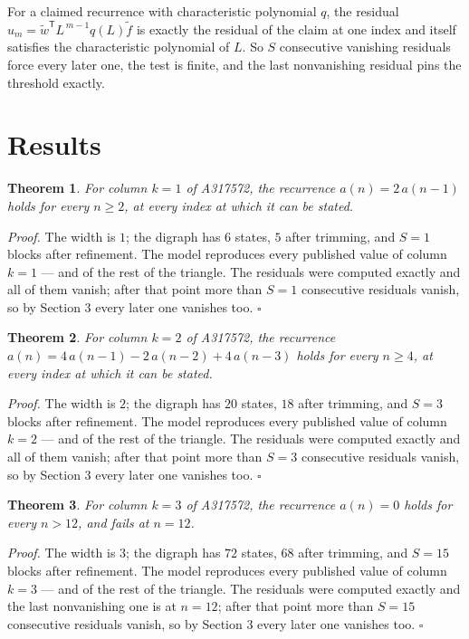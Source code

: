 \documentclass[11pt]{article}
\newtheorem{theorem}{Theorem}
\theoremstyle{definition}
\begin{document}
For a claimed recurrence with characteristic polynomial $q$, the residual $u_m = \tilde w^{\mathsf T}L^{\,m-1}q(L)\tilde f$ is exactly the residual of the claim at one index and itself satisfies the characteristic polynomial of $L$. So $S$ consecutive vanishing residuals force every later one, the test is finite, and the last nonvanishing residual pins the threshold exactly.

\section{Results}

\begin{theorem} For column $k = 1$ of A317572, the recurrence $a(n) = 2\,a(n-1)$ holds for every $n \ge 2$, at every index at which it can be stated.\end{theorem}

{\itshape Proof.} The width is $1$; the digraph has $6$ states, $5$ after trimming, and $S = 1$ blocks after refinement. The model reproduces every published value of column $k = 1$ --- and of the rest of the triangle. The residuals were computed exactly and all of them vanish; after that point more than $S = 1$ consecutive residuals vanish, so by Section 3 every later one vanishes too. $\square$

\begin{theorem} For column $k = 2$ of A317572, the recurrence $a(n) = 4\,a(n-1) - 2\,a(n-2) + 4\,a(n-3)$ holds for every $n \ge 4$, at every index at which it can be stated.\end{theorem}

{\itshape Proof.} The width is $2$; the digraph has $20$ states, $18$ after trimming, and $S = 3$ blocks after refinement. The model reproduces every published value of column $k = 2$ --- and of the rest of the triangle. The residuals were computed exactly and all of them vanish; after that point more than $S = 3$ consecutive residuals vanish, so by Section 3 every later one vanishes too. $\square$

\begin{theorem} For column $k = 3$ of A317572, the recurrence $a(n) = 0$ holds for every $n > 12$, and fails at $n = 12$.\end{theorem}

{\itshape Proof.} The width is $3$; the digraph has $72$ states, $68$ after trimming, and $S = 15$ blocks after refinement. The model reproduces every published value of column $k = 3$ --- and of the rest of the triangle. The residuals were computed exactly and the last nonvanishing one is at $n = 12$; after that point more than $S = 15$ consecutive residuals vanish, so by Section 3 every later one vanishes too. $\square$
\end{document}

